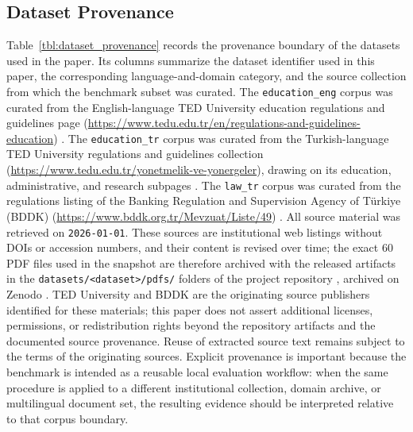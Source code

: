 \subsection{Dataset Provenance}\label{dataset-provenance}

Table~\ref{tbl:dataset_provenance} records the provenance boundary of the datasets used in the paper. Its columns summarize the dataset identifier used in this paper, the corresponding language-and-domain category, and the source collection from which the benchmark subset was curated. The \texttt{education\_eng} corpus was curated from the English-language TED University education regulations and guidelines page (\url{https://www.tedu.edu.tr/en/regulations-and-guidelines-education}) \citep{TED_Regulations}. The \texttt{education\_tr} corpus was curated from the Turkish-language TED University regulations and guidelines collection (\url{https://www.tedu.edu.tr/yonetmelik-ve-yonergeler}), drawing on its education, administrative, and research subpages \citep{TED_Regulations_TR}. The \texttt{law\_tr} corpus was curated from the regulations listing of the Banking Regulation and Supervision Agency of T\"urkiye (BDDK) (\url{https://www.bddk.org.tr/Mevzuat/Liste/49}) \citep{BDDK_Mevzuat}. All source material was retrieved on \texttt{2026-01-01}. These sources are institutional web listings without DOIs or accession numbers, and their content is revised over time; the exact 60 PDF files used in the snapshot are therefore archived with the released artifacts in the \texttt{datasets/<dataset>/pdfs/} folders of the project repository \citep{GitHub_RagRetrievalBench}, archived on Zenodo \citep{Zenodo_RagRetrievalBench}. TED University and BDDK are the originating source publishers identified for these materials; this paper does not assert additional licenses, permissions, or redistribution rights beyond the repository artifacts and the documented source provenance. Reuse of extracted source text remains subject to the terms of the originating sources. Explicit provenance is important because the benchmark is intended as a reusable local evaluation workflow: when the same procedure is applied to a different institutional collection, domain archive, or multilingual document set, the resulting evidence should be interpreted relative to that corpus boundary.

